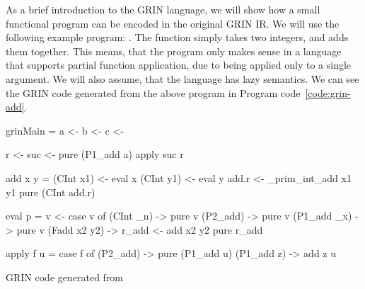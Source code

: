 \documentclass[main.tex]{subfiles}
\begin{document}
	As a brief introduction to the GRIN language, we will show how a small functional program can be encoded in the original GRIN IR. We will use the following example program: . The  function simply takes two integers, and adds them together. This means, that the program only makes sense in a language that supports partial function application, due to  being applied only to a single argument. We will also assume, that the language has lazy semantics. We can see the GRIN code generated from the above program in Program code~\ref{code:grin-add}.
	
	\hspace{-0.5cm}
	\begin{codeFloat}
		\begin{minipage}{0.48\textwidth}
			\begin{haskell}
	      grinMain =
	        a <- %
	        b <- %
	        c <- %
	        
	        r <- %
	        suc <- pure (P1_add a)
	        apply suc r
	
	      add x y =
	        (CInt x1) <- eval x
	        (CInt y1) <- eval y
	        add.r <- _prim_int_add x1 y1
	        pure (CInt add.r)
			\end{haskell}
		\end{minipage}
		\hfill
		\begin{minipage}{0.50\textwidth}
			\begin{haskellNum}{12}
	     eval p =
	       v <- %
	       case v of
	         (CInt _n)   -> pure v
	         (P2_add)    -> pure v
	         (P1_add _x) -> pure v
	         (Fadd x2 y2) ->
	           r_add <- add x2 y2
	           pure r_add
	       
	     apply f u =
	       case f of
	         (P2_add) -> 
	           pure (P1_add u)
	         (P1_add z) -> add z u
			\end{haskellNum}
		\end{minipage}
		\caption{GRIN code generated from }
		\label{code:grin-add}
		
	\end{codeFloat}
		
\end{document}
